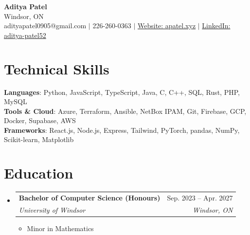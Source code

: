 \documentclass[letterpaper,11pt]{article}
\makeatletter
\newcommand{\resumeItem}[1]{
  \item\small{
    {#1 \vspace{-2pt}}
  }
}
\newcommand{\resumeSubheading}[4]{
  \vspace{-2pt}\item
    \begin{tabular*}{0.97\textwidth}[t]{l@{\extracolsep{\fill}}r}
      \textbf{#1} & #2 \\
      \textit{\small#3} & \textit{\small #4} \\
    \end{tabular*}\vspace{-7pt}
}
\newcommand{\resumeSubHeadingListStart}{\begin{itemize}[leftmargin=0.15in, label={}]}
\newcommand{\resumeSubHeadingListEnd}{\end{itemize}\vspace{-8pt}}
\newcommand{\resumeItemListStart}{\begin{itemize}\vspace{-2pt}}
\newcommand{\resumeItemListEnd}{\end{itemize}\vspace{-8pt}}
\makeatother
\begin{document}
\begin{center}
    \textbf{\Huge Aditya Patel} \\ \vspace{1pt}
    Windsor, ON \\ \vspace{1pt}
     {adityapatel0905@gmail.com} $|$ {226-260-0363} $|$ \href{https://apatel.xyz/}{Website: apatel.xyz} $|$ \href{https://www.linkedin.com/in/aditya-patel52/}{LinkedIn: aditya-patel52}
\end{center}


\section{Technical Skills}
 \begin{itemize}[leftmargin=0.15in, label={}]
    \small{\item{
     \textbf{Languages}{: Python, JavaScript, TypeScript, Java, C, C++, SQL, Rust, PHP, MySQL} \\
     \textbf{Tools \& Cloud}{: Azure, Terraform, Ansible, NetBox IPAM, Git, Firebase, GCP, Docker, Supabase, AWS} \\
     \textbf{Frameworks}{: React.js, Node.js, Express, Tailwind, PyTorch, pandas, NumPy, Scikit-learn, Matplotlib}
    }}
    \vspace{-6pt}
 \end{itemize}

\section{Education}
  \resumeSubHeadingListStart
    \resumeSubheading
      {Bachelor of Computer Science (Honours)}{Sep. 2023 -- Apr. 2027}
      {University of Windsor}{Windsor, ON}
        \resumeItemListStart
            \resumeItem{Minor in Mathematics}
        \resumeItemListEnd
  \resumeSubHeadingListEnd
\end{document}
